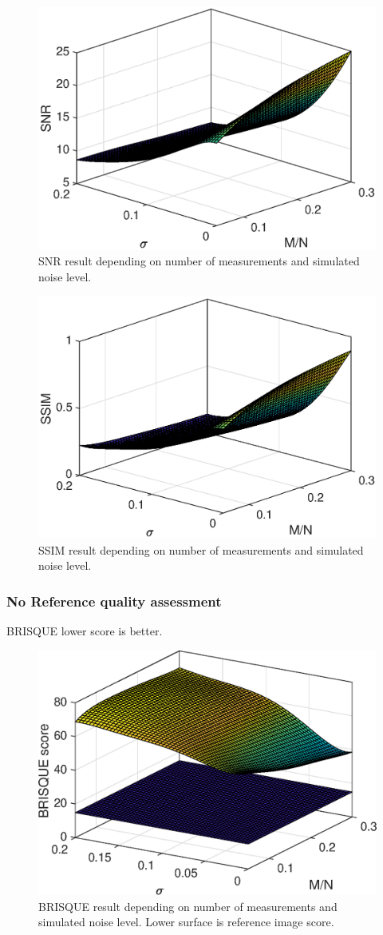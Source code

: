 \begin{figure}[H]
    \centering
    \includegraphics[width = 0.7\linewidth]{result/synt_sss/SNR_fit.eps}
    \caption{SNR result depending on number of measurements and simulated noise level.}
    \label{fig:snr_3d}
\end{figure}

\begin{figure}[H]
    \centering
    \includegraphics[width = 0.7\linewidth]{result/synt_sss/SSIM_fit.eps}
    \caption{SSIM result depending on number of measurements and simulated noise level.}
    \label{fig:ssim_3d}
\end{figure}

\subsubsection{No Reference quality assessment}
BRISQUE lower score is better.

\begin{figure}[H]
    \centering
    \includegraphics[width = 0.7\linewidth]{result/synt_brisque/BRISQUE_fit.eps}
    \caption{BRISQUE result depending on number of measurements and simulated noise level. Lower surface is reference image score.}
    \label{fig:Brisque_3d}
\end{figure}


